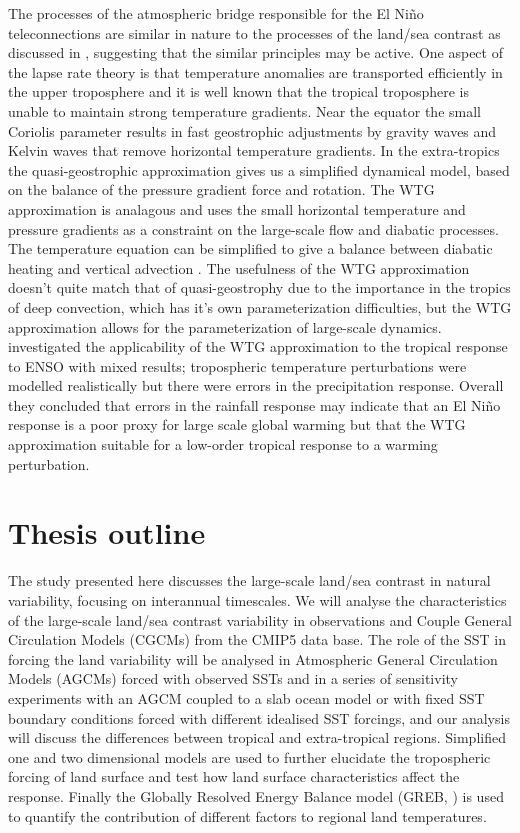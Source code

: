 The processes of the atmospheric bridge responsible for the El Ni{\~n}o 
teleconnections are similar in nature to the processes of the land/sea contrast 
as discussed in \citet{Joshi2008}, suggesting that the similar principles may be 
active. One aspect of the \citet{Joshi2008} lapse rate theory is that 
temperature anomalies are transported efficiently in the upper troposphere and 
it is well known that the tropical troposphere is unable to maintain strong 
temperature gradients.  Near the equator the small Coriolis parameter results in 
fast geostrophic adjustments by gravity waves and Kelvin waves that remove 
horizontal temperature gradients.  In the extra-tropics the quasi-geostrophic 
approximation gives us a simplified dynamical model, based on the balance of the 
pressure gradient force and rotation.  The WTG approximation is analagous and 
uses the small horizontal temperature and pressure gradients as a constraint on 
the large-scale flow and diabatic processes. The temperature equation can be 
simplified to give a balance between diabatic heating and vertical advection 
\citep{Sobel2001}. The usefulness of the WTG approximation doesn't quite match 
that of quasi-geostrophy due to the importance in the tropics of deep 
convection, which has it's own parameterization difficulties, but the WTG 
approximation allows for the parameterization of large-scale dynamics.  
\citet{Lintner2005}  investigated the applicability of the WTG approximation to 
the tropical response to ENSO with mixed results; tropospheric temperature 
perturbations were modelled realistically but there were errors in the 
precipitation response. Overall they concluded that errors in the rainfall 
response may indicate that an El Ni{\~n}o response is a poor proxy for large 
scale global warming but that the WTG approximation suitable for a low-order 
tropical response to a warming perturbation.


\section{Thesis outline}

The study presented here discusses the large-scale land/sea contrast in natural 
variability, focusing on interannual timescales. We will analyse the 
characteristics of the large-scale land/sea contrast variability in observations 
and Couple General Circulation Models (CGCMs) from the CMIP5 data base. The role 
of the SST in forcing the land variability will be analysed in Atmospheric 
General Circulation Models (AGCMs) forced with observed SSTs and in a series of 
sensitivity experiments with an AGCM coupled to a slab ocean model or with fixed 
SST boundary conditions forced with different idealised SST forcings, and our 
analysis will discuss the differences between tropical and extra-tropical 
regions. Simplified one and two dimensional models are used to further elucidate 
the tropospheric forcing of land surface and test how land surface 
characteristics affect the response. Finally the Globally Resolved Energy 
Balance model (GREB, \citet{Dommenget2011}) is used to quantify the contribution 
of different factors to regional land temperatures.

